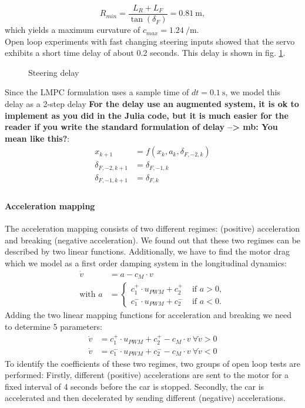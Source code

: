 \begin{equation}
R_{min} = \frac{L_R+L_F}{\tan(\delta_F)} = \SI{0.81}{\meter},
\end{equation}
which yields a maximum curvature of $c_{max}=\SI{1.24}{\per\meter}$.\\
Open loop experiments with fast changing steering inputs showed that the servo exhibits a short time delay of about 0.2 seconds. This delay is shown in fig. \ref{fig:d_f_delay}.
\begin{figure}[ht]
    \centering
      
    \caption{Steering delay}
    \label{fig:d_f_delay}
\end{figure}
Since the LMPC formulation uses a sample time of $dt=\SI{0.1}{\second}$, we model this delay as a 2-step delay {\bfseries{For the delay use an augmented system, it is ok to implement as you did in the Julia code, but it is much easier for the reader if you write the standard formulation of delay --> mb: You mean like this?}}:
\begin{align}
x_{k+1}&=f(x_k,a_k,\delta_{F,-2,k})\\
\delta_{F,-2,k+1}&=\delta_{F,-1,k}\\
\delta_{F,-1,k+1}&=\delta_{F,k}\\
\end{align}
\paragraph{Acceleration mapping} The acceleration mapping consists of two different regimes: (positive) acceleration and breaking (negative acceleration). We found out that these two regimes can be described by two linear functions. Additionally, we have to find the motor drag which we model as a first order damping system in the longitudinal dynamics:
\begin{align}
\dot v &= a - c_M\cdot v\\
\text{with } a&=\begin{cases}
c_{1}^+\cdot u_{PWM}+c_{2}^+ &\text{ if } a>0,\\
c_{1}^-\cdot u_{PWM}+c_{2}^- &\text{ if } a<0.
\end{cases}
\end{align}
Adding the two linear mapping functions for acceleration and breaking we need to determine 5 parameters:
\begin{align}
\dot v &= c_{1}^+\cdot u_{PWM}+c_{2}^+ - c_M\cdot v\ \forall \dot v > 0\\
\dot v &= c_{1}^-\cdot u_{PWM}+c_{2}^- - c_M\cdot v\ \forall \dot v < 0
\end{align}
To identify the coefficients of these two regimes, two groups of open loop tests are performed: Firstly, different (positive) accelerations are sent to the motor for a fixed interval of 4 seconds before the car is stopped. Secondly, the car is accelerated and then decelerated by sending different (negative) accelerations.

